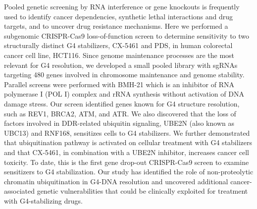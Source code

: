 Pooled genetic screening by RNA interference or gene knockouts is frequently used to identify cancer dependencies, synthetic lethal interactions and drug targets, and to uncover drug resistance mechanisms. Here we performed a subgenomic CRISPR-Cas9 loss-of-function screen to determine sensitivity to two structurally distinct G4 stabilizers, CX-5461 and PDS, in human colorectal cancer cell line, HCT116. Since genome maintenance processes are the most relevant for G4 resolution, we developed a small pooled library with sgRNAs targeting 480 genes involved in chromosome maintenance and genome stability. Parallel screens were performed with BMH-21 which is an inhibitor of RNA polymerase I (POL I) complex and rRNA synthesis without activation of DNA damage stress\cite{Colis2014,Peltonen2014}. Our screen identified genes known for G4 structure resolution, such as REV1, BRCA2, ATM, and ATR. We also discovered that the loss of factors involved in DDR-related ubiquitin signaling, UBE2N (also known as UBC13) and RNF168, sensitizes cells to G4 stabilizers. We further demonstrated that ubiquitination pathway is activated on cellular treatment with G4 stabilizers and that CX-5461, in combination with a UBE2N inhibitor, increases cancer cell toxicity. To date, this is the first gene drop-out CRISPR-Cas9 screen to examine sensitizers to G4 stabilization. Our study has identified the role of non-proteolytic chromatin ubiquitination in G4-DNA resolution and uncovered additional cancer-associated genetic vulnerabilities that could be clinically exploited for treatment with G4-stabilizing drugs.